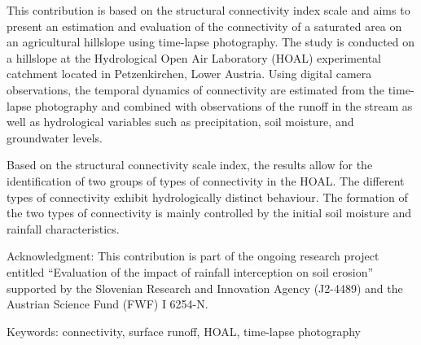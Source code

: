 This contribution is based on the structural connectivity index scale and aims to present an estimation and evaluation of the connectivity of a saturated area on an agricultural hillslope using time-lapse photography. The study is conducted on a hillslope at the Hydrological Open Air Laboratory (HOAL) experimental catchment located in Petzenkirchen, Lower Austria. Using digital camera observations, the temporal dynamics of connectivity are estimated from the time-lapse photography and combined with observations of the runoff in the stream as well as hydrological variables such as precipitation, soil moisture, and groundwater levels.

Based on the structural connectivity scale index, the results allow for the identification of two groups of types of connectivity in the HOAL. The different types of connectivity exhibit hydrologically distinct behaviour. The formation of the two types of connectivity is mainly controlled by the initial soil moisture and rainfall characteristics.

Acknowledgment: This contribution is part of the ongoing research project entitled “Evaluation of the impact of rainfall interception on soil erosion” supported by the Slovenian Research and Innovation Agency (J2-4489) and the Austrian Science Fund (FWF) I 6254-N.

Keywords: connectivity, surface runoff, HOAL, time-lapse photography
\newpage{}
{}
\begin{flushleft}






\end{flushleft}

